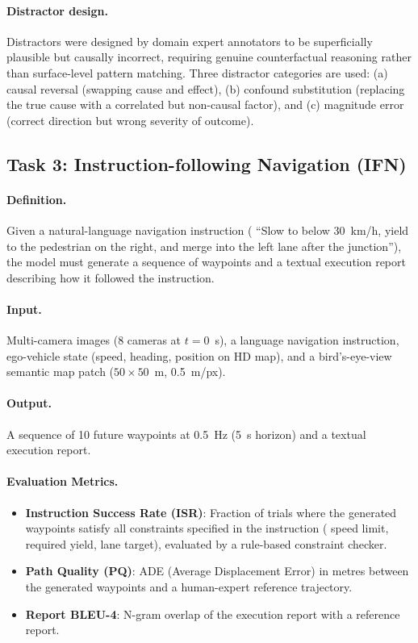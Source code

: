 \paragraph{Distractor design.}
Distractors were designed by domain expert annotators to be superficially plausible
but causally incorrect, requiring genuine counterfactual reasoning rather than
surface-level pattern matching. Three distractor categories are used: (a) causal
reversal (swapping cause and effect), (b) confound substitution (replacing the true
cause with a correlated but non-causal factor), and (c) magnitude error (correct
direction but wrong severity of outcome).

\subsection{Task 3: Instruction-following Navigation (IFN)}
\label{ssec:task_ifn}

\paragraph{Definition.}
Given a natural-language navigation instruction (\eg{} ``Slow to below 30~km/h,
yield to the pedestrian on the right, and merge into the left lane after the
junction''), the model must generate a sequence of waypoints and a textual
execution report describing how it followed the instruction.

\paragraph{Input.}
Multi-camera images (8 cameras at $t=0$~s), a language navigation instruction,
ego-vehicle state (speed, heading, position on HD map), and a bird's-eye-view
semantic map patch ($50 \times 50$~m, 0.5~m/px).

\paragraph{Output.}
A sequence of 10 future waypoints at 0.5~Hz (5~s horizon) and a textual
execution report.

\paragraph{Evaluation Metrics.}
\begin{itemize}[leftmargin=2em, noitemsep]
  \item \textbf{Instruction Success Rate (ISR)}: Fraction of trials where
        the generated waypoints satisfy all constraints specified in the instruction
        (\eg{} speed limit, required yield, lane target), evaluated by a rule-based
        constraint checker.
  \item \textbf{Path Quality (PQ)}: ADE (Average Displacement Error) in metres
        between the generated waypoints and a human-expert reference trajectory.
  \item \textbf{Report BLEU-4}: N-gram overlap of the execution report with
        a reference report.
\end{itemize}

